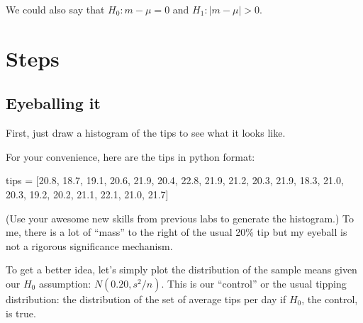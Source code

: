 \begin{fullwidth}
\noindent We could also say that $H_0: m - \mu = 0$ and $H_1: |m-\mu| > 0$.

\section{Steps}

\subsection{Eyeballing it}

\step First, just draw a histogram of the tips to see what it looks like.


For your convenience, here are the tips in python format:

\begin{pyverbatim}
tips = [20.8, 18.7, 19.1, 20.6, 21.9, 20.4, 22.8,
        21.9, 21.2, 20.3, 21.9, 18.3, 21.0, 20.3,
        19.2, 20.2, 21.1, 22.1, 21.0, 21.7]
\end{pyverbatim}

(Use your awesome new skills from previous labs to generate the histogram.) To me, there is a lot of ``mass'' to the right of the usual 20\% tip but my eyeball is not a rigorous significance mechanism. 

\step To get a better idea, let's simply plot the distribution of the sample means given our $H_0$ assumption: $N(0.20, s^2/n)$. This is our ``control'' or the usual tipping distribution: the distribution of the set of average tips per day if $H_0$, the control, is true.


\end{fullwidth}
